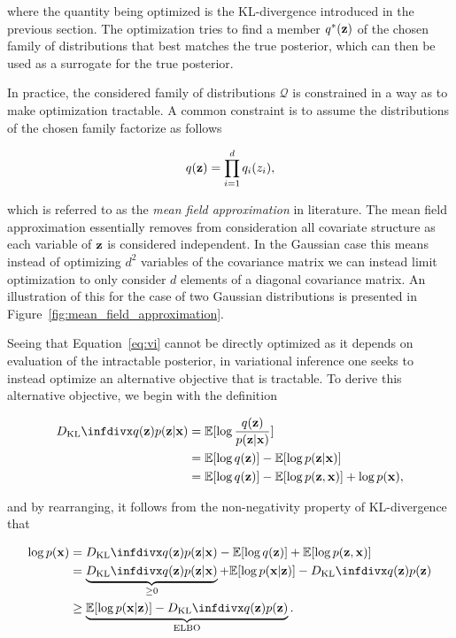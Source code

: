 where the quantity being optimized is the KL-divergence introduced in the previous section. The optimization tries to find a member $q^{*}(\mathbf{z})$ of the chosen family of distributions that best matches the true posterior, which can then be used as a surrogate for the true posterior.

In practice, the considered family of distributions $\mathcal{Q}$ is constrained in a way as to make optimization tractable. A common constraint is to assume the distributions of the chosen family factorize as follows

$$q(\mathbf{z}) = \prod_{i=1}^{d} q_{i}(z_{i}),$$

which is referred to as the \textit{mean field approximation} in literature. The mean field approximation essentially removes from consideration all covariate structure as each variable of $\mathbf{z}$ is considered independent. In the Gaussian case this means instead of optimizing $d^2$ variables of the covariance matrix we can instead limit optimization to only consider $d$ elements of a diagonal covariance matrix. An illustration of this for the case of two Gaussian distributions is presented in Figure~\ref{fig:mean_field_approximation}.

Seeing that Equation~\ref{eq:vi} cannot be directly optimized as it depends on evaluation of the intractable posterior, in variational inference one seeks to instead optimize an alternative objective that is tractable. To derive this alternative objective, we begin with the definition

\begin{equation}
\begin{aligned}
\dkl{q(\bz)}{p(\bz \vert \bx)} &= \mathbb{E}[\log \frac{q(\bz)}{p(\bz \vert \bx)}] \\
                               &= \mathbb{E}[\log q(\bz)] - \mathbb{E}[\log p(\bz \vert \bx)] \\
                               &= \mathbb{E}[\log q(\bz)] - \mathbb{E}[\log p(\bz, \bx)] + \log p(\bx),
\end{aligned}
\end{equation}

and by rearranging, it follows from the non-negativity property of KL-divergence that

\begin{equation}
\begin{aligned}
\log p(\bx) &= \dkl{q(\bz)}{p(\bz \vert \bx)} - \mathbb{E}[\log q(\bz)] + \mathbb{E}[\log p(\bz, \bx)] \\
            &= \underbrace{\dkl{q(\bz)}{p(\bz \vert \bx)}}_{\geq 0} + \mathbb{E}[\log p(\bx \vert \bz)] - \dkl{q(\bz)}{p(\bz)} \\
            &\geq \underbrace{\mathbb{E}[\log p(\bx \vert \bz)] - \dkl{q(\bz)}{p(\bz)}}_{\text{ELBO}}.
\end{aligned}
\end{equation}

